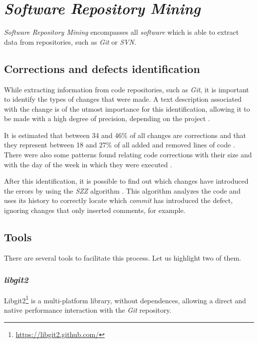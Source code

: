 \section{\emph{Software Repository Mining}}

\emph{Software Repository Mining} encompasses all \emph{software} which is able to extract data from repositories, such as \emph{Git} or \emph{SVN}.

\subsection{Corrections and defects identification}

While extracting information from code repositories, such as \emph{Git}, it is important to identify the types of changes that were made. A text description associated with the change is of the utmost importance for this identification, allowing it to be made with a high degree of precision, depending on the project \cite{Mockus2000}.

It is estimated that between 34 and 46\% of all changes are corrections and that they represent between 18 and 27\% of all added and removed lines of code \cite{Mockus2000}. There were also some patterns found relating code corrections with their size and with the day of the week in which they were executed \cite{Sliwerski2005}.

After this identification, it is possible to find out which changes have introduced the errors by using the \emph{SZZ} algorithm \cite{Sliwerski2005}. This algorithm analyzes the code and uses its history to correctly locate which \emph{commit} has introduced the defect, ignoring changes that only inserted comments, for example.

\subsection{Tools}

There are several tools to facilitate this process. Let us highlight two of them.

\subsubsection{\emph{libgit2}}

Libgit2\footnote{\url{https://libgit2.github.com/}} is a multi-platform library, without dependences, allowing a direct and native performance interaction with the \emph{Git} repository.

